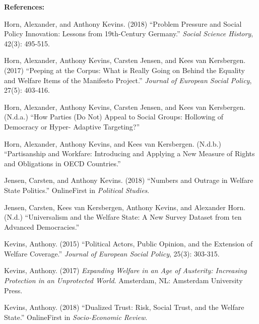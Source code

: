 \documentclass[letterpaper]{scrartcl}
\begin{document}
  \pagebreak

  \textbf{References:}
  \vspace{-1em}

  \begin{hangparas}{.25in}{1}

    Horn, Alexander, and Anthony Kevins. (2018) ``Problem Pressure and Social Policy Innovation: Lessons from 19th-Century Germany.'' \textit{Social Science History}, 42(3): 495-515.
    \vspace{-.5em}

    Horn, Alexander, Anthony Kevins, Carsten Jensen, and Kees van Kersbergen. (2017) ``Peeping at the Corpus: What is Really Going on Behind the Equality and Welfare Items of the Manifesto Project.'' \textit{Journal of European Social Policy}, 27(5): 403-416.
    \vspace{-.5em}

    Horn, Alexander, Anthony Kevins, Carsten Jensen, and Kees van Kersbergen. (N.d.a.) ``How Parties (Do Not) Appeal to Social Groups: Hollowing of Democracy or Hyper- Adaptive Targeting?''
    \vspace{-.5em}

    Horn, Alexander, Anthony Kevins, and Kees van Kersbergen. (N.d.b.) ``Partisanship and Workfare: Introducing and Applying a New Measure of Rights and Obligations in OECD Countries.''
    \vspace{-.5em}

    Jensen, Carsten, and Anthony Kevins. (2018) ``Numbers and Outrage in Welfare State Politics.'' OnlineFirst in \textit{Political Studies}.
    \vspace{-.5em}

    Jensen, Carsten, Kees van Kersbergen, Anthony Kevins, and Alexander Horn. (N.d.) ``Universalism and the Welfare State: A New Survey Dataset from ten Advanced Democracies.''
    \vspace{-.5em}

    Kevins, Anthony. (2015) ``Political Actors, Public Opinion, and the Extension of Welfare Coverage.'' \textit{Journal of European Social Policy}, 25(3): 303-315.
    \vspace{-.5em}

    Kevins, Anthony. (2017) \textit{Expanding Welfare in an Age of Austerity: Increasing Protection in an Unprotected World}. Amsterdam, NL: Amsterdam University Press.
    \vspace{-.5em}

    Kevins, Anthony. (2018) ``Dualized Trust: Risk, Social Trust, and the Welfare State.'' OnlineFirst in \textit{Socio-Economic Review}.
    \vspace{-.5em}


\end{hangparas}
\end{document}
